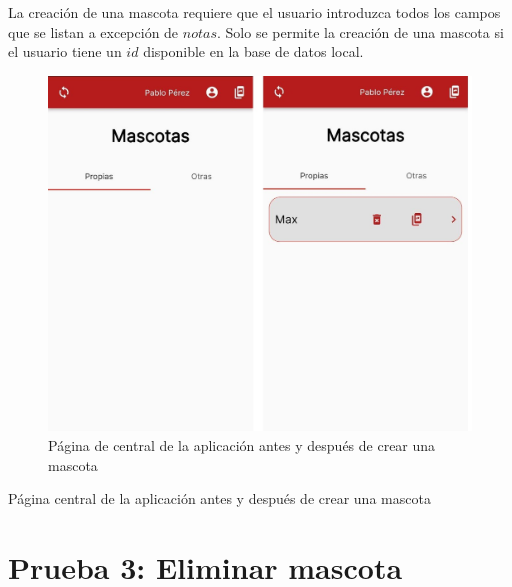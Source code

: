 La creación de una mascota requiere que el usuario introduzca todos los campos que se listan a excepción de $notas$. Solo se permite la creación de una mascota si el usuario tiene un $id$ disponible en la base de datos local.

\begin{figure}[h!]
\begin{center}
\includegraphics[scale=0.19]{Graphics/images/hcvet/home.jpg}
\caption{ Página de central de la aplicación antes y después de crear una mascota}
\label{fig:bac}

\end{center}
\end{figure}

Página central de la aplicación antes y después de crear una mascota

\newpage
\section{Prueba 3: Eliminar mascota}

